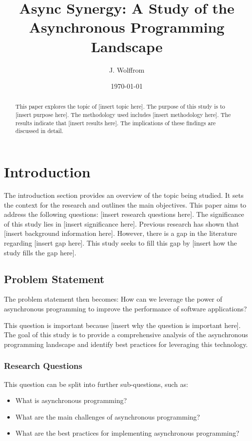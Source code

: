 \documentclass{article}
\title{Async Synergy: A Study of the Asynchronous Programming Landscape}
\author{J. Wolffrom}
\date{\today}
\begin{document}
\maketitle

\begin{abstract}
This paper explores the topic of [insert topic here]. The purpose of this study is to [insert purpose here]. The methodology used includes [insert methodology here]. The results indicate that [insert results here]. The implications of these findings are discussed in detail.
\end{abstract}

\tableofcontents

\newpage
\section{Introduction}

The introduction section provides an overview of the topic being studied. It sets the context for the research and outlines the main objectives. This paper aims to address the following questions: [insert research questions here]. The significance of this study lies in [insert significance here]. Previous research has shown that [insert background information here]. However, there is a gap in the literature regarding [insert gap here]. This study seeks to fill this gap by [insert how the study fills the gap here].

\subsection{Problem Statement}

The problem statement then becomes: How can we leverage the power of asynchronous programming to improve the performance of software applications? 
\newline

This question is important because [insert why the question is important here]. The goal of this study is to provide a comprehensive analysis of the asynchronous programming landscape and identify best practices for leveraging this technology.

\subsubsection{Research Questions}

This question can be split into further sub-questions, such as:

\begin{itemize}
    \item What is asynchronous programming?
    \item What are the main challenges of asynchronous programming?
    \item What are the best practices for implementing asynchronous programming?
\end{itemize}
\end{document}
